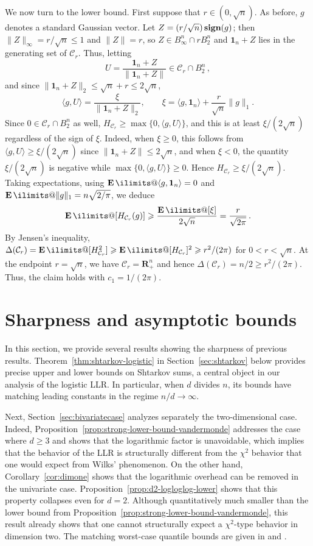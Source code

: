 \documentclass[11pt, letterpaper, hidelinks]{article}
\makeatletter
\renewcommand{\proofname}{\textit{\textbf{Proof}}}
\renewenvironment{proof}[1][\proofname]{\par\pushQED{\qed}\normalfont \topsep6\p@\@plus6\p@\relax\trivlist\item[\hskip\labelsep#1\@addpunct{}]\ignorespaces}{\popQED\endtrivlist\@endpefalse}
\newcommand{\R}{\mathbf R}
\DeclareMathOperator{\sign}{\bf sign}
\newcommand{\1}{\mathbf 1}
\renewcommand{\leq}{\leqslant}
\renewcommand{\geq}{\geqslant}
\newcommand{\E}{\operatorname*{\mathbf{E}}\ilimits@}
\theoremstyle{plain}
\theoremstyle{definition}
\newcommand{\defn}{=}
\makeatother
\begin{document}
\begin{proof}
We now turn to the lower bound. First suppose that $r\in(0,\sqrt n)$. As before, $g$ denotes a standard Gaussian vector. Let $Z \defn(r/\sqrt n)\sign(g)$; then $\|Z\|_\infty=r/\sqrt n\leq1$ and $\|Z\|=r$, so $Z \in B_\infty^n\cap rB_2^n$ and $\1_n + Z$ lies in the generating set of $\mathcal C_r$. Thus, letting
\[
U = \frac{\1_n + Z}{\|\1_n + Z\|} \in \mathcal C_r \cap B_2^n \, ,
\]
 and since $\|\1_n + Z\|_2\leq\sqrt n+r\leq2\sqrt n$,
\[
\langle g,U\rangle=\frac{\xi}{\|\1_n+Z\|_2}, \qquad \xi\defn\langle g,\1_n\rangle+\frac{r}{\sqrt n}\|g\|_1.
\]
Since $0\in\mathcal C_r\cap B_2^n$ as well, $H_{\mathcal{C}_r} \geq \max\{0,\langle g,U\rangle\}$, and this is at least $\xi/(2\sqrt n)$ regardless of the sign of $\xi$. Indeed, when $\xi\geq0$, this follows from $\langle g,U\rangle\geq \xi/(2\sqrt n)$ since $\|\1_n + Z\| \leq 2\sqrt n$, and when $\xi < 0$, the quantity $\xi/(2\sqrt n)$ is negative while $\max\{0,\langle g,U\rangle\} \geq 0$. Hence $H_{\mathcal{C}_r}\geq \xi/(2\sqrt n)$. Taking expectations, using $\E\langle g,\1_n\rangle=0$ and $\E\|g\|_1 = n\sqrt{2/\pi}$, we deduce
\[
\E[H_{\mathcal C_r}(g)]
	\geq \frac{\E[\xi]}{2\sqrt n}
	= \frac{r}{\sqrt{2\pi}} \, .
\]
	By Jensen's inequality, $\Delta(\mathcal C_r) = \E[H_{\mathcal C_r}^2] \geq \E[H_{\mathcal C_r}]^2 \geq r^2/(2\pi)$ for $0<r<\sqrt n$. At the endpoint $r=\sqrt n$, we have $\mathcal C_r=\R_+^n$ and hence $\Delta(\mathcal C_r)=n/2\geq r^2/(2\pi)$. Thus, the claim holds with $c_1=1/(2\pi)$.

\end{proof}





\section{Sharpness and asymptotic bounds}
\label{sec:sharpness-boundaries}

In this section, we provide several results showing the sharpness of previous results. Theorem~\ref{thm:shtarkov-logistic} in Section~\ref{sec:shtarkov} below provides precise upper and lower bounds on Shtarkov sums, a central object in our analysis of the logistic LLR. In particular, when $d$ divides $n$, its bounds have matching leading constants in the regime $n/d\to\infty$.

Next, Section~\ref{sec:bivariatecase} analyzes separately the two-dimensional case. Indeed, Proposition~\ref{prop:strong-lower-bound-vandermonde} addresses the case where $d\geq 3$ and shows that the logarithmic factor is unavoidable, which implies that the behavior of the LLR is structurally different from the $\chi^2$ behavior that one would expect from Wilks' phenomenon. On the other hand, Corollary~\ref{cor:dimone} shows that the logarithmic overhead can be removed in the univariate case. Proposition~\ref{prop:d2-logloglog-lower} shows that this property collapses even for $d=2$. Although quantitatively much smaller than the lower bound from Proposition~\ref{prop:strong-lower-bound-vandermonde}, this result already shows that one cannot structurally expect a $\chi^2$-type behavior in dimension two. The matching worst-case quantile bounds are given in  and .
\end{document}
